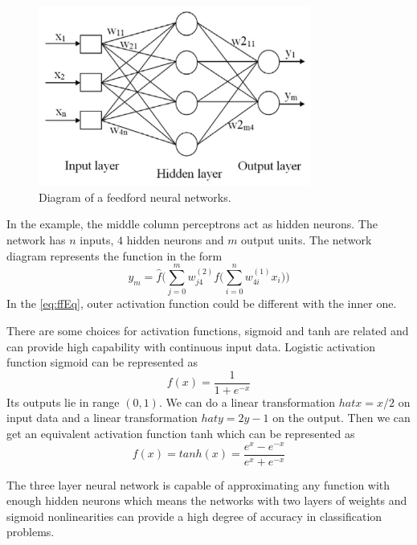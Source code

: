 \begin{figure}[!htb]
\centering
\includegraphics[width=0.8\textwidth]{Figure2-2.png}
\caption{\label{fig:ffnet}Diagram of a feedford neural networks.}
\end{figure}

In the example, the middle column perceptrons act as hidden neurons. The network has $n$ inputs, $4$ hidden neurons and $m$ output units. The network diagram represents the function in the form
\begin{equation}\label{eq:ffEq}
y_{m} = \hat{f}\Big(\sum_{j=0}^{m}w_{j4}^{(2)}f\big(\sum_{i=0}^{n}w_{4i}^{(1)}x_{i}\big)\Big)
\end{equation}
In the \ref{eq:ffEq}, outer activation function could be different with the inner one.

There are some choices for activation functions, sigmoid and tanh are related and can provide high capability with continuous input data. Logistic activation function sigmoid can be represented as 
\begin{equation}\label{eq:sigmoid}
f(x) = \frac{1}{1+e^{-x}}
\end{equation}
Its outputs lie in range $(0,1)$. We can do a linear transformation $hat{x}=x/2$ on input data and a linear transformation $hat{y}=2y-1$ on the output. Then we can get an equivalent activation function tanh which can be represented as
\begin{equation}\label{eq:tanh}
f(x) = tanh(x) = \frac{e^{x}-e^{-x}}{e^{x}+e^{-x}}
\end{equation}

The three layer neural network is capable of approximating any function with enough hidden neurons which means the networks with two layers of weights and sigmoid nonlinearities can provide a high degree of accuracy in classification problems. 

